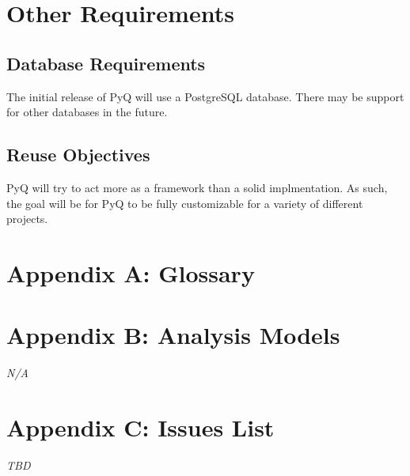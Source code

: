 \documentclass{report}
\begin{document}
  \section{Other Requirements}
   \subsection{Database Requirements}
   The initial release of PyQ will use a PostgreSQL database. There may be support for other databases in the future.
   \subsection{Reuse Objectives}
   PyQ will try to act more as a framework than a solid implmentation. As such, the goal will be for PyQ to be fully customizable for a variety of different projects.
  \section*{Appendix A: Glossary}
  \section*{Appendix B: Analysis Models}
  \textit{N/A}
  \section*{Appendix C: Issues List}
  \textit{TBD}
\end{document}
